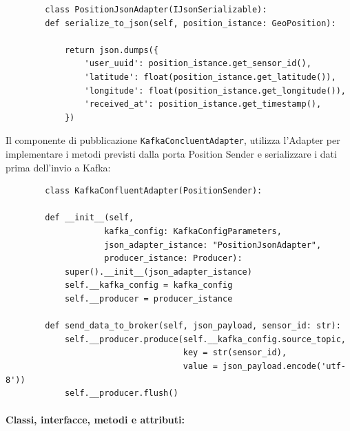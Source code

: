 \documentclass[10pt]{article}
\newcommand{\myparagraph}[1]{\paragraph{#1}\mbox{}\\}
\begin{document}
    \begin{lstlisting}
        class PositionJsonAdapter(IJsonSerializable):
        def serialize_to_json(self, position_istance: GeoPosition):
    
            return json.dumps({
                'user_uuid': position_istance.get_sensor_id(),
                'latitude': float(position_istance.get_latitude()),
                'longitude': float(position_istance.get_longitude()),
                'received_at': position_istance.get_timestamp(),
            })
    \end{lstlisting}
    Il componente di pubblicazione \texttt{KafkaConcluentAdapter}, utilizza l’Adapter per implementare i metodi previsti dalla porta Position Sender e  serializzare i dati prima dell’invio a Kafka:
    \begin{lstlisting}
        class KafkaConfluentAdapter(PositionSender):
    
        def __init__(self,
                    kafka_config: KafkaConfigParameters,
                    json_adapter_istance: "PositionJsonAdapter",
                    producer_istance: Producer):
            super().__init__(json_adapter_istance)
            self.__kafka_config = kafka_config
            self.__producer = producer_istance
    
        def send_data_to_broker(self, json_payload, sensor_id: str):
            self.__producer.produce(self.__kafka_config.source_topic,
                                    key = str(sensor_id),
                                    value = json_payload.encode('utf-8'))
            self.__producer.flush()
    \end{lstlisting}

    \myparagraph{Classi, interfacce, metodi e attributi:}
    
\end{document}
